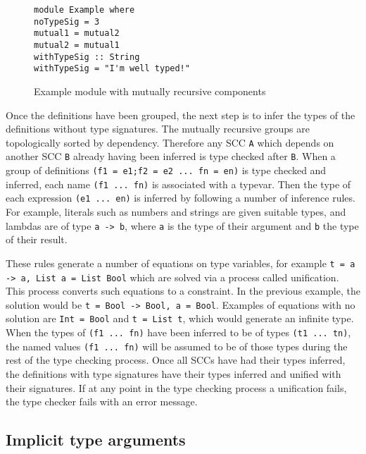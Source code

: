 \begin{figure}[!htb]
\centering
\begin{minipage}[b]{0.55\linewidth}
\centering
\begin{lstlisting}
module Example where
noTypeSig = 3
mutual1 = mutual2
mutual2 = mutual1
withTypeSig :: String
withTypeSig = "I'm well typed!"
\end{lstlisting}
\end{minipage}
\caption{Example module with mutually recursive components}
\label{lst:tc_impl}
\end{figure}

Once the definitions have been grouped, the next step is to infer the types of the definitions without type signatures. The mutually recursive groups are topologically sorted by dependency. Therefore any SCC \texttt{A} which depends on another SCC \texttt{B} already having been inferred is type checked after \texttt{B}. When a group of definitions \texttt{(f1 = e1;f2 = e2 ... fn = en)} is type checked and inferred, each name \texttt{(f1 ... fn)} is associated with a \gls{typevar}. Then the type of each expression \texttt{(e1 ... en)} is inferred by following a number of inference rules. For example, literals such as numbers and strings are given suitable types, and lambdas are of type \texttt{a -> b},  where \texttt{a} is the type of their argument and \texttt{b} the type of their result.

These rules generate a number of equations on type variables, for example \texttt{t = a -> a, List a = List Bool} which are solved via a process called \gls{unification}. This process converts such equations to a \gls{constraint}. In the previous example, the solution would be \texttt{t = Bool -> Bool, a = Bool}. Examples of equations with no solution are \texttt{Int = Bool} and \texttt{t = List t}, which would generate an infinite type.
When the types of \texttt{(f1 ... fn)} have been inferred to be of types \texttt{(t1 ... tn)}, the named values \texttt{(f1 ... fn)} will be assumed to be of those types during the rest of the type checking process. Once all SCCs  have had their types inferred, the definitions with type signatures have their types inferred and unified with their signatures. If at any point in the type checking process a unification fails, the type checker fails with an error message.

\subsection{Implicit type arguments}

